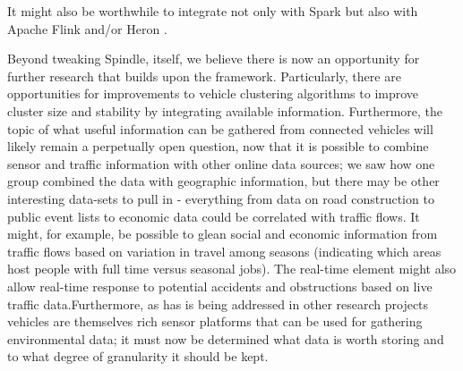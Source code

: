 \documentclass{thesis}
\begin{document}
    It might also be worthwhile to integrate not only with Spark but also with Apache Flink \cite{flink}
    and/or Heron \cite{heron}.

    Beyond tweaking Spindle, itself, we believe there is now an opportunity for further research that builds
    upon the framework. Particularly, there are opportunities for improvements to vehicle clustering algorithms
    to improve cluster size and stability by integrating available information. Furthermore, the topic of what
    useful information can be gathered from connected vehicles will likely remain a perpetually open question,
    now that it is possible to combine sensor and traffic information with other online data sources; we saw
    how one group combined the data with geographic information, but there may be other interesting data-sets
    to pull in - everything from data on road construction to public event lists to economic data could be
    correlated with traffic flows. It might, for example, be possible to glean social and economic information
    from traffic flows based on variation in travel among seasons (indicating which areas host people with full
    time versus seasonal jobs). The real-time element might also allow real-time response to potential accidents
    and obstructions based on live traffic data.Furthermore, as has is being addressed in other research projects %
    vehicles are themselves rich sensor platforms that can be used for gathering environmental data; it must
    now be determined what data is worth storing and to what degree of granularity it should be kept.

\begin{singlespace}


\end{singlespace}
\end{document}
